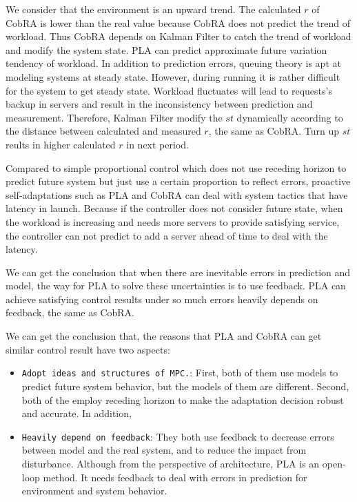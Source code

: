 \documentclass[sigconf]{acmart}
\begin{document}
We consider that the environment is an upward trend. The calculated $r$ of CobRA is lower than the real value because CobRA  does not predict the trend of workload. Thus CobRA depends on Kalman Filter to catch the trend of workload and modify the system state. PLA can predict approximate future variation tendency of workload. In addition to prediction errors, queuing theory is apt at modeling systems at steady state. However, during running it is rather difficult for the system to get steady state. Workload fluctuates will lead to requests's backup in servers and result in the inconsistency between prediction and measurement. Therefore, Kalman Filter modify the $st$ dynamically according to the distance between calculated and measured $r$, the same as CobRA. Turn up $st$ reults in higher calculated $r$ in next period.

Compared to simple proportional control which does not use receding horizon to predict future system but just use a certain proportion to reflect errors, proactive self-adaptations such as PLA and CobRA can deal with system tactics that have latency in launch. Because if the controller does not consider future state, when the workload is increasing and needs more servers to provide satisfying service, the controller can not predict to add a server ahead of time to deal with the latency.

We can get the conclusion that when there are inevitable errors in prediction and model, the way for PLA to solve these uncertainties is to use feedback. PLA can achieve satisfying control results under so much errors heavily depends on feedback, the same as CobRA.

We can get the conclusion that, the reasons that PLA and CobRA can get similar control result have two aspects: 
\begin{itemize}
	\item {\verb|Adopt ideas and structures of MPC.|}:
	First, both of them use models to predict future system behavior, but the models of them are different. Second, both of the employ receding horizon to make the adaptation decision robust and accurate. In addition, 
	\item {\verb|Heavily depend on feedback|}:
	They both use feedback to decrease errors between model and the real system, and to reduce the impact from disturbance. Although from the perspective of architecture, PLA is an open-loop method. It needs feedback to deal with errors in prediction for environment and system behavior.	
\end{itemize}
\end{document}
